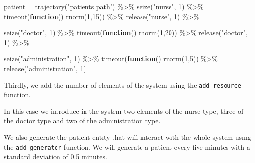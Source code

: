 \documentclass[
]{book}
\newenvironment{Shaded}{\begin{snugshade}}{\end{snugshade}}
\newcommand{\ControlFlowTok}[1]{\textcolor[rgb]{0.13,0.29,0.53}{\textbf{#1}}}
\newcommand{\DecValTok}[1]{\textcolor[rgb]{0.00,0.00,0.81}{#1}}
\newcommand{\FunctionTok}[1]{\textcolor[rgb]{0.00,0.00,0.00}{#1}}
\newcommand{\NormalTok}[1]{#1}
\newcommand{\OtherTok}[1]{\textcolor[rgb]{0.56,0.35,0.01}{#1}}
\newcommand{\SpecialCharTok}[1]{\textcolor[rgb]{0.00,0.00,0.00}{#1}}
\newcommand{\StringTok}[1]{\textcolor[rgb]{0.31,0.60,0.02}{#1}}
\begin{document}
\begin{Shaded}
\begin{Highlighting}[]
\NormalTok{patient }\OtherTok{=} \FunctionTok{trajectory}\NormalTok{(}\StringTok{"patients path"}\NormalTok{) }\SpecialCharTok{\%\textgreater{}\%}
  \FunctionTok{seize}\NormalTok{(}\StringTok{"nurse"}\NormalTok{, }\DecValTok{1}\NormalTok{) }\SpecialCharTok{\%\textgreater{}\%}
  \FunctionTok{timeout}\NormalTok{(}\ControlFlowTok{function}\NormalTok{() }\FunctionTok{rnorm}\NormalTok{(}\DecValTok{1}\NormalTok{,}\DecValTok{15}\NormalTok{)) }\SpecialCharTok{\%\textgreater{}\%}
  \FunctionTok{release}\NormalTok{(}\StringTok{"nurse"}\NormalTok{, }\DecValTok{1}\NormalTok{) }\SpecialCharTok{\%\textgreater{}\%}
  
  \FunctionTok{seize}\NormalTok{(}\StringTok{"doctor"}\NormalTok{, }\DecValTok{1}\NormalTok{) }\SpecialCharTok{\%\textgreater{}\%}
  \FunctionTok{timeout}\NormalTok{(}\ControlFlowTok{function}\NormalTok{() }\FunctionTok{rnorm}\NormalTok{(}\DecValTok{1}\NormalTok{,}\DecValTok{20}\NormalTok{)) }\SpecialCharTok{\%\textgreater{}\%}
  \FunctionTok{release}\NormalTok{(}\StringTok{"doctor"}\NormalTok{, }\DecValTok{1}\NormalTok{) }\SpecialCharTok{\%\textgreater{}\%}
  
  \FunctionTok{seize}\NormalTok{(}\StringTok{"administration"}\NormalTok{, }\DecValTok{1}\NormalTok{) }\SpecialCharTok{\%\textgreater{}\%}
  \FunctionTok{timeout}\NormalTok{(}\ControlFlowTok{function}\NormalTok{() }\FunctionTok{rnorm}\NormalTok{(}\DecValTok{1}\NormalTok{,}\DecValTok{5}\NormalTok{)) }\SpecialCharTok{\%\textgreater{}\%}
  \FunctionTok{release}\NormalTok{(}\StringTok{"administration"}\NormalTok{, }\DecValTok{1}\NormalTok{)}
\end{Highlighting}
\end{Shaded}

Thirdly, we add the number of elements of the system using the \texttt{add\_resource} function.

In this case we introduce in the system two elements of the nurse type, three of the doctor type and two of the administration type.

We also generate the patient entity that will interact with the whole system using the \texttt{add\_generator} function. We will generate a patient every five minutes with a standard deviation of 0.5 minutes.
\end{document}
